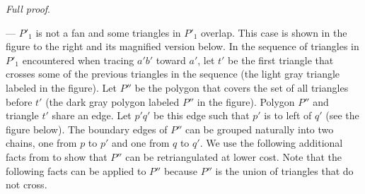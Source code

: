 \documentclass[final]{siamltex}
\newcommand{\tri}{t}  \newcommand{\vertex}{v}
\newenvironment{fullproof}{\par{\it Full proof}. \ignorespaces}{\endproof}
\begin{document}
\begin{fullproof}
 --- $P'_1$ is not a fan and some triangles in $P'_1$ overlap.
This case is shown in the figure to the right and its magnified version below.
In the sequence of triangles in $P'_1$ 
encountered when tracing $a' b'$ toward $a'$, let $\tri'$ be the first triangle 
that crosses some of the previous triangles in the sequence (the light gray triangle labeled in the figure).
Let $P''$ be the polygon that covers the set of all triangles before $\tri'$ (the dark gray polygon labeled $P''$ in the figure).
Polygon $P''$ and triangle $\tri'$ share an edge. Let $p' q'$ be this edge such that $p'$ is to left of $q'$ (see the figure below).
The boundary edges of $P''$ can be grouped naturally into two chains, one from $p$ to $p'$ and 
one from $q$ to $q'$.
We use the following additional facts from \cite{drysdale2001exclusion} to show that $P''$ can be retriangulated at lower cost.
Note that the following facts can be applied to $P''$ because 
$P''$ is the union of triangles that do not cross.
\end{window}


\end{fullproof}
\end{document}
